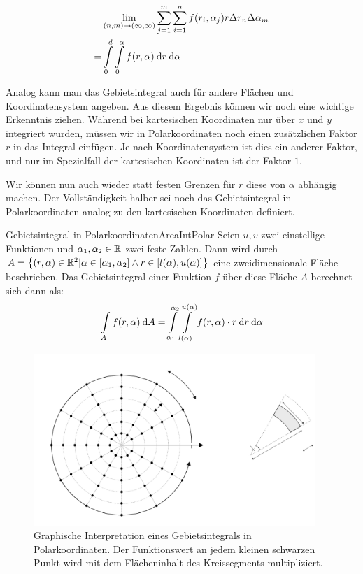 \begin{center}
    \begin{alignat*}{1}
      & \lim\limits_{(n,m) \to (\infty, \infty)} \sum\limits_{j=1}^m \sum\limits_{i=1}^n f(r_i,\alpha_j) r \Delta r_n \Delta \alpha_m  \\
    = & \int\limits_0^d \int\limits_0^\alpha f(r, \alpha) \:\mathrm{d}{r} \:\mathrm{d}{\alpha}
    \end{alignat*}
\end{center}

Analog kann man das Gebietsintegral auch für andere Flächen und Koordinatensystem angeben. Aus diesem Ergebnis können wir noch eine wichtige Erkenntnis ziehen. Während bei kartesischen Koordinaten nur über $x$ und $y$ integriert wurden, müssen wir in Polarkoordinaten noch einen zusätzlichen Faktor $r$ in das Integral einfügen. Je nach Koordinatensystem ist dies ein anderer Faktor, und nur im Spezialfall der kartesischen Koordinaten ist der Faktor $1$.

Wir können nun auch wieder statt festen Grenzen für $r$ diese von $\alpha$ abhängig machen. Der Vollständigkeit halber sei noch das Gebietsintegral in Polarkoordinaten analog zu den kartesischen Koordinaten definiert.

\begin{definition}{Gebietsintegral in Polarkoordinaten}{AreaIntPolar}
    Seien $u,v$ zwei einstellige Funktionen und $\alpha_1,\alpha_2\in\mathbb{R}$ zwei feste Zahlen. Dann wird durch $A = \left\lbrace (r,\alpha) \in \mathbb{R}^2 | \alpha \in [\alpha_1,\alpha_2] \land r \in [l(\alpha), u(\alpha)] \right\rbrace$ eine zweidimensionale Fläche beschrieben. Das Gebietsintegral einer Funktion $f$ über diese Fläche $A$ berechnet sich dann als:
    $$
    \int\limits_{A} f(r,\alpha) \:\mathrm{d}{A} = \int\limits_{\alpha_1}^{\alpha_2} \int\limits_{l(\alpha)}^{u(\alpha)} f(r,\alpha) \cdot r \:\mathrm{d}{r} \:\mathrm{d}{\alpha}
    $$
\end{definition}

\begin{figure}
    \centering
    \includegraphics[width=0.95\textwidth]{./svg/integral-2d-polar}
    \caption{Graphische Interpretation eines Gebietsintegrals in Polarkoordinaten. Der Funktionswert an jedem kleinen schwarzen Punkt wird mit dem Flächeninhalt des Kreissegments multipliziert.}
    \label{fig:AreaIntegPolar}
\end{figure}

